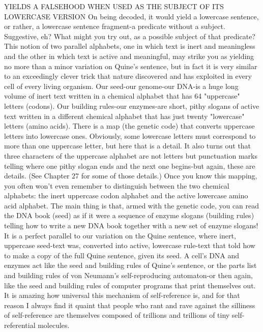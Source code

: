 YIELDS A FALSEHOOD WHEN USED AS THE SUBJECT OF ITS LOWERCASE VERSION 
On being decoded, it would yield a lowercase sentence, or rather, a lowercase sentence fragment-a predicate without a subject. Suggestive, eh? What might you try out, as a possible subject of that predicate? This notion of two parallel alphabets, one in which text is inert and meaningless and the other in which text is active and meaningful, may strike you as yielding no more than a minor variation on Quine's sentence, but in fact it is very similar to an exceedingly clever trick that nature discovered and has exploited in every cell of every living organism. Our seed-our genome-our DNA-is a huge long volume of inert text written in a chemical alphabet that has 64 "uppercase" letters (codons). Our building rules-our enzymes-are short, pithy slogans of active text written in a different chemical alphabet that has just twenty "lowercase" letters (amino acids). There is a map (the genetic code) that converts uppercase letters into lowercase ones. Obviously, some lowercase letters must correspond to more than one uppercase letter, but here that is a detail. It also turns out that three characters of the uppercase alphabet are not letters but punctuation marks telling where one pithy slogan ends and the next one begins-but again, these are details. \intro (See Chapter 27 for some of those details.) \endintro
Once you know this mapping, you often won't even remember to distinguish between the two chemical alphabets: the inert uppercase codon alphabet and the active lowercase amino acid alphabet. The main thing is that, armed with the genetic code, you can read the DNA book (seed) as if it were a sequence of enzyme slogans (building rules) telling how to write a new DNA book together with a new set of enzyme slogans! It is a perfect parallel to our variation on the Quine sentence, where inert, uppercase seed-text was, converted into active, lowercase rule-text that told how to make a copy of the full Quine sentence, given its seed. A cell's DNA and enzymes act like the seed and building rules of Quine's sentence, or the parts list and building rules of von Neumann's self-reproducing automaton-or then again, like the seed and building rules of computer programs that print themselves out. It is amazing how universal this mechanism of self-reference is, and for that reason I always find it quaint that people who rant and rave against the silliness of self-reference are themselves composed of trillions and trillions of tiny self-referential molecules. 
\separator

